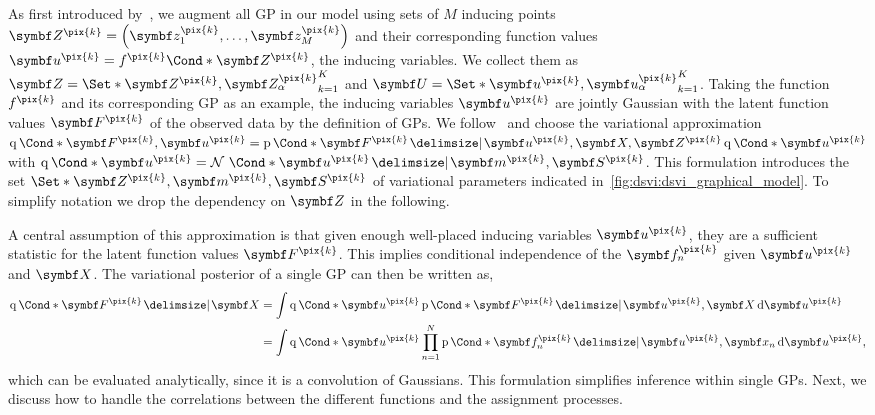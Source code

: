 As first introduced by~\textcite{titsias_variational_2009}, we augment all GP in our model using sets of $M$ inducing points $\mat{Z^{\pix{k}}} = \left(\mat{z_1^{\pix{k}}}, \ldots, \mat{z_M^{\pix{k}}}\right)$ and their corresponding function values $\mat{u^{\pix{k}}} = \Fun*{f^{\pix{k}}}{\mat{Z^{\pix{k}}}}$, the inducing variables.
We collect them as $\mat{Z} = \Set*{\mat{Z^{\pix{k}}}, \mat{Z_\alpha^{\pix{k}}}}_{k=1}^K$ and $\mat{U} = \Set*{\mat{u^{\pix{k}}}, \mat{u_\alpha^{\pix{k}}}}_{k=1}^K$.
Taking the function $f^{\pix{k}}$ and its corresponding GP as an example, the inducing variables $\mat{u^{\pix{k}}}$ are jointly Gaussian with the latent function values $\mat{F^{\pix{k}}}$ of the observed data by the definition of GPs.
We follow~\parencite{hensman_gaussian_2013} and choose the variational approximation $\Variat*{\mat{F^{\pix{k}}}, \mat{u^{\pix{k}}}} = \Prob*{\mat{F^{\pix{k}}} \given \mat{u^{\pix{k}}}, \mat{X}, \mat{Z^{\pix{k}}}}\Variat*{\mat{u^{\pix{k}}}}$ with $\Variat*{\mat{u^{\pix{k}}}} = \Gaussian*{\mat{u^{\pix{k}}} \given \mat{m^{\pix{k}}}, \mat{S^{\pix{k}}}}$.
This formulation introduces the set $\Set*{\mat{Z^{\pix{k}}}, \mat{m^{\pix{k}}}, \mat{S^{\pix{k}}}}$ of variational parameters indicated in~\cref{fig:dsvi:dsvi_graphical_model}.
To simplify notation we drop the dependency on $\mat{Z}$ in the following.

A central assumption of this approximation is that given enough well-placed inducing variables $\mat{u^{\pix{k}}}$, they are a sufficient statistic for the latent function values $\mat{F^{\pix{k}}}$.
This implies conditional independence of the $\mat{f_n^{\pix{k}}}$ given $\mat{u^{\pix{k}}}$ and $\mat{X}$.
The variational posterior of a single GP can then be written as,
\begin{align}
    \begin{split}
        \Variat*{\mat{F^{\pix{k}}} \given \mat{X}}
        &=
        \int \Variat*{\mat{u^{\pix{k}}}}
        \Prob*{\mat{F^{\pix{k}}} \given \mat{u^{\pix{k}}}, \mat{X}}
        \diff \mat{u^{\pix{k}}}
        \\
        &=
        \int \Variat*{\mat{u^{\pix{k}}}}
        \prod_{n=1}^N \Prob*{\mat{f_n^{\pix{k}}} \given \mat{u^{\pix{k}}}, \mat{x_n}}
        \diff \mat{u^{\pix{k}}},
    \end{split}
\end{align}
which can be evaluated analytically, since it is a convolution of Gaussians.
This formulation simplifies inference within single GPs.
Next, we discuss how to handle the correlations between the different functions and the assignment processes.

